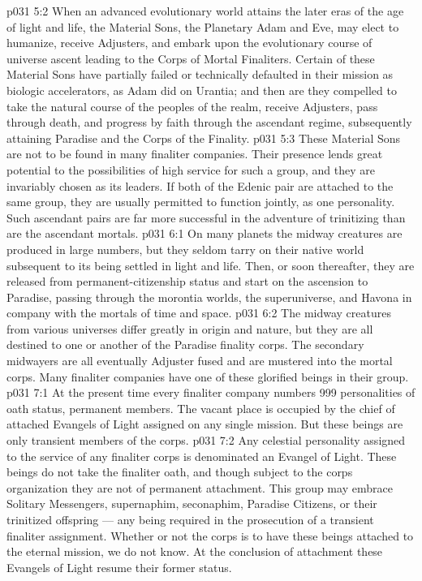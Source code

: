 \vs p031 5:2 When an advanced evolutionary world attains the later eras of the age of light and life, the Material Sons, the Planetary Adam and Eve, may elect to humanize, receive Adjusters, and embark upon the evolutionary course of universe ascent leading to the Corps of Mortal Finaliters. Certain of these Material Sons have partially failed or technically defaulted in their mission as biologic accelerators, as Adam did on Urantia; and then are they compelled to take the natural course of the peoples of the realm, receive Adjusters, pass through death, and progress by faith through the ascendant regime, subsequently attaining Paradise and the Corps of the Finality.
\vs p031 5:3 These Material Sons are not to be found in many finaliter companies. Their presence lends great potential to the possibilities of high service for such a group, and they are invariably chosen as its leaders. If both of the Edenic pair are attached to the same group, they are usually permitted to function jointly, as one personality. Such ascendant pairs are far more successful in the adventure of trinitizing than are the ascendant mortals.
\vs p031 6:1 On many planets the midway creatures are produced in large numbers, but they seldom tarry on their native world subsequent to its being settled in light and life. Then, or soon thereafter, they are released from permanent\hyp{}citizenship status and start on the ascension to Paradise, passing through the morontia worlds, the superuniverse, and Havona in company with the mortals of time and space.
\vs p031 6:2 The midway creatures from various universes differ greatly in origin and nature, but they are all destined to one or another of the Paradise finality corps. The secondary midwayers are all eventually Adjuster fused and are mustered into the mortal corps. Many finaliter companies have one of these glorified beings in their group.
\vs p031 7:1 At the present time every finaliter company numbers 999 personalities of oath status, permanent members. The vacant place is occupied by the chief of attached Evangels of Light assigned on any single mission. But these beings are only transient members of the corps.
\vs p031 7:2 Any celestial personality assigned to the service of any finaliter corps is denominated an Evangel of Light. These beings do not take the finaliter oath, and though subject to the corps organization they are not of permanent attachment. This group may embrace Solitary Messengers, supernaphim, seconaphim, Paradise Citizens, or their trinitized offspring --- any being required in the prosecution of a transient finaliter assignment. Whether or not the corps is to have these beings attached to the eternal mission, we do not know. At the conclusion of attachment these Evangels of Light resume their former status.
